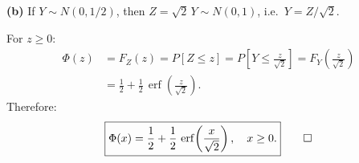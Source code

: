 \documentclass[11pt]{article}
\newcommand{\erf}{\operatorname{erf}}
\begin{document}
\textbf{(b)} If $Y\sim N(0,1/2)$, then $Z=\sqrt{2}\,Y\sim N(0,1)$, i.e.\ $Y=Z/\sqrt{2}$.

For $z\ge 0$:
\begin{align*}
\Phi(z) &= F_Z(z) = P[Z\le z] = P\!\left[Y\le \frac{z}{\sqrt{2}}\right] = F_Y\!\left(\frac{z}{\sqrt{2}}\right)\\
&= \frac{1}{2}+\frac{1}{2}\,\erf\!\left(\frac{z}{\sqrt{2}}\right).
\end{align*}
Therefore:
\[
\boxed{\Phi(x) = \frac{1}{2}+\frac{1}{2}\,\erf\!\left(\frac{x}{\sqrt{2}}\right),\quad x\ge 0.} \qed
\]
\end{document}
